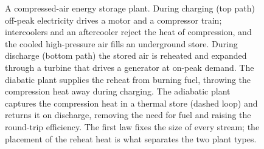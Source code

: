 \begin{figure}[htbp]
\caption[Compressed-air energy storage plant]{A compressed-air energy
storage plant. During charging (top path) off-peak electricity drives a
motor and a compressor train; intercoolers and an aftercooler reject the
heat of compression, and the cooled high-pressure air fills an underground
store. During discharge (bottom path) the stored air is reheated and
expanded through a turbine that drives a generator at on-peak demand. The
diabatic plant supplies the reheat from burning fuel, throwing the
compression heat away during charging. The adiabatic plant captures the
compression heat in a thermal store (dashed loop) and returns it on
discharge, removing the need for fuel and raising the round-trip
efficiency. The first law fixes the size of every stream; the placement of
the reheat heat is what separates the two plant types.}
\label{fig:vol04ch01:caes-schematic}
\end{figure}
